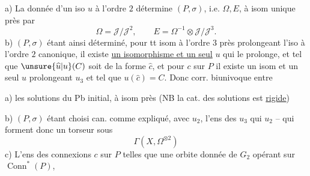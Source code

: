 a) La donnée d'un iso $u$ à l'ordre $2$ détermine $(P,\sigma)$, i.e. $\Omega,E$, à isom unique près par
\[
\Omega=\mathcal J/\mathcal J^2,\qquad E=\Omega^{-1}\otimes\mathcal J/\mathcal J^3.
\]
b) $(P,\sigma)$ étant ainsi déterminé, pour tt isom  à l'ordre $3$ près
prolongeant l'iso à l'ordre $2$ canonique, il existe \uline{un isomorphisme et un seul} $u$ qui le prolonge, et tel que $\unsure{\widehat u|u}(C)$ soit de la forme $\widehat c$, et pour 
$c$  sur $P$ il existe un isom et un seul $u$  prolongeant $u_3$ et tel que $u(\widehat c)=C$.
Donc corr. biunivoque entre

a) les solutions du Pb initial, à isom près (NB la cat. des solutions est \uline{rigide})

b) $(P,\sigma)$ étant choisi can. comme expliqué, avec $u_2$, l'ens des  $u_3$ qui  $u_2$ -- qui forment donc un  torseur sous
\[
\Gamma(X,\Omega^{\otimes2})
\]
c) L'ens des connexions $c$ sur $P$  telles que   une orbite donnée de $G_2$ opérant sur $\operatorname{Conn}^*(P)$, 

